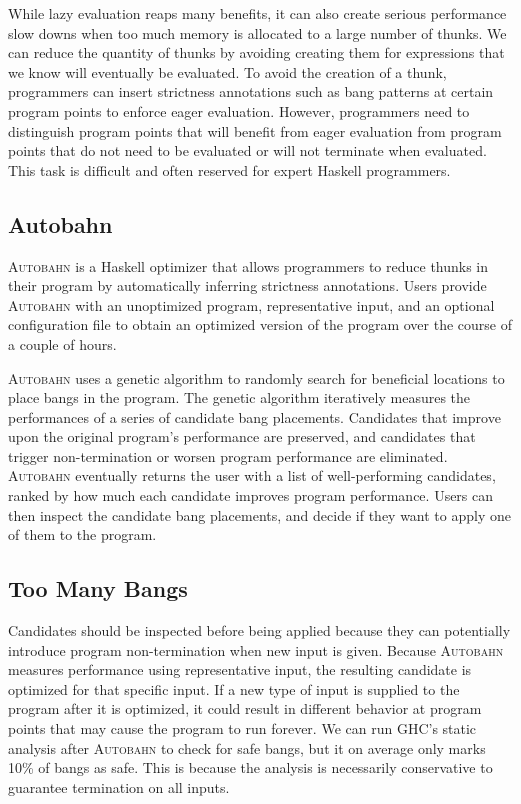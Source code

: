 \documentclass[format=sigplan, review=true]{acmart}
\begin{document}
While lazy evaluation reaps many benefits, it can also create serious performance slow downs when too much memory is allocated to a large number of thunks. We can reduce the quantity of thunks by avoiding creating them for expressions that we know will eventually be evaluated. To avoid the creation of a thunk, programmers can insert strictness annotations such as bang patterns at certain program points to enforce eager evaluation. However, programmers need to distinguish program points that will benefit from eager evaluation from program points that do not need to be evaluated or will not terminate when evaluated. This task is difficult and often reserved for expert Haskell programmers. 

\subsection{Autobahn}

\textsc{Autobahn} is a Haskell optimizer that allows programmers to reduce thunks in their program by automatically inferring strictness annotations. Users provide \textsc{Autobahn} with an unoptimized program, representative input, and an optional configuration file to obtain an optimized version of the program over the course of a couple of hours. 

\textsc{Autobahn} uses a genetic algorithm to randomly search for beneficial locations to place bangs in the program. The genetic algorithm iteratively measures the performances of a series of candidate bang placements. Candidates that improve upon the original program's performance are preserved, and candidates that trigger non-termination or worsen program performance are eliminated. \textsc{Autobahn} eventually returns the user with a list of well-performing candidates, ranked by how much each candidate improves program performance. Users can then inspect the candidate bang placements, and decide if they want to apply one of them to the program.

\subsection{Too Many Bangs}

Candidates should be inspected before being applied because they can potentially introduce program non-termination when new input is given. Because \textsc{Autobahn} measures performance using representative input, the resulting candidate is optimized for that specific input. If a new type of input is supplied to the program after it is optimized, it could result in different behavior at program points that may cause the program to run forever. We can run GHC's static analysis after \textsc{Autobahn} to check for safe bangs, but it on average only marks 10\% of bangs as safe. This is because the analysis is necessarily conservative to guarantee termination on all inputs. 
\end{document}
